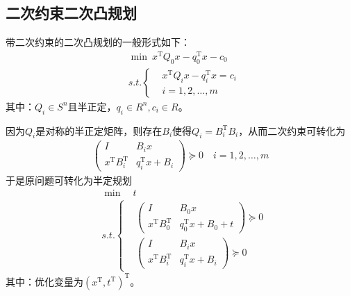     \subsection{二次约束二次凸规划}
        \par
        带二次约束的二次凸规划的一般形式如下：
        \begin{align*}
          & \mathop{\min} \ x^\mathrm{T}  Q_0x-q_0^\mathrm{T} x-c_0\\
          & s.t. \left\{
          \begin{aligned}
          & x^\mathrm{T} Q_ix-q_i^\mathrm{T} x= c_i\\
          & i=1,2,\ldots ,m
          \end{aligned}
          \right.
        \end{align*}
        其中：$Q_i\in S^n$且半正定，$q_i \in R^n,c_i \in R$。
        \par
        因为$Q_i$是对称的半正定矩阵，则存在$B_i$使得$Q_i=B_i^\mathrm{T} B_i$，从而二次约束可转化为
        \begin{align*}
          \begin{pmatrix} I & B_ix\\ x^\mathrm{T} B_i^\mathrm{T}  & q_i^\mathrm{T} x+B_i\end{pmatrix}\succeq 0\quad i=1,2,\ldots ,m
        \end{align*}
        于是原问题可转化为半定规划
        \begin{align*}
          & \mathop{\min} \quad t\\
          & s.t.
          \left\{
          \begin{aligned}
          & \begin{pmatrix} I & B_0x\\ x^\mathrm{T} B_0^\mathrm{T}  & q_0^\mathrm{T} x+B_0+t\end{pmatrix}\succeq 0\\
          & \begin{pmatrix} I & B_ix\\ x^\mathrm{T} B_i^\mathrm{T}  & q_i^\mathrm{T} x+B_i\end{pmatrix}\succeq 0
          \end{aligned}
          \right.
        \end{align*}
        其中：优化变量为$(x^\mathrm{T} ,t^\mathrm{T} )^\mathrm{T} $。

